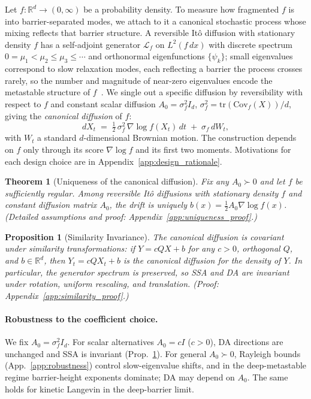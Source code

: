 \documentclass{article}
\newcommand{\R}{\mathbb{R}}
\newcommand{\Cov}{\mathrm{Cov}}
\newcommand{\tr}{\mathrm{tr}}
\newtheorem{theorem}{Theorem}
\newtheorem{proposition}{Proposition}
\begin{document}
Let $f : \R^d \to (0, \infty)$ be a probability density. To measure how fragmented $f$ is into barrier-separated modes, we attach to it a canonical stochastic process whose mixing reflects that barrier structure. A reversible It\^o diffusion with stationary density
$f$ has a self-adjoint generator $\mathcal{L}_f$ on $L^2(f\,dx)$ with
discrete spectrum $0 = \mu_1 < \mu_2 \leq \mu_3 \leq \cdots$ and
orthonormal eigenfunctions $\{\psi_k\}$; small eigenvalues correspond to
slow relaxation modes, each reflecting a barrier the process crosses
rarely, so the number and magnitude of near-zero eigenvalues encode the
metastable structure of $f$~\cite{Pavliotis2014}.
We single out a specific diffusion by reversibility with respect to $f$ and constant scalar diffusion $A_0 = \sigma_f^2 I_d$, $\sigma_f^2 = \tr(\Cov_f(X))/d$, giving the \emph{canonical diffusion} of $f$:
\begin{equation}
dX_t \;=\; \tfrac12\,\sigma_f^2\,\nabla \log f(X_t)\,dt \;+\; \sigma_f\,dW_t,
\label{eq:canonical_sde}
\end{equation}
with $W_t$ a standard $d$-dimensional Brownian motion. The construction
depends on $f$ only through its score $\nabla\log f$ and its first two moments. Motivations for each design choice are in Appendix~\ref{app:design_rationale}.



\begin{theorem}[Uniqueness of the canonical diffusion]
\label{thm:uniqueness}
Fix any $A_0\succ 0$ and let $f$ be sufficiently regular. Among reversible It\^o diffusions with stationary density $f$ and constant diffusion matrix $A_0$, the drift is uniquely $b(x) = \tfrac12 A_0\nabla\log f(x)$. (Detailed assumptions and proof: Appendix~\ref{app:uniqueness_proof}.)
\end{theorem}

\begin{proposition}[Similarity Invariance]
\label{prop:similarity_invariance}
The canonical diffusion is covariant under similarity transformations: if $Y = cQX + b$ for any $c > 0$, orthogonal $Q$, and $b \in \R^d$, then $Y_t = cQX_t + b$ is the canonical diffusion for the density of $Y$. In particular, the generator spectrum is preserved, so SSA and DA are invariant under rotation, uniform rescaling, and translation. (Proof: Appendix~\ref{app:similarity_proof}.)
\end{proposition}

\paragraph{Robustness to the coefficient choice.}
We fix $A_0 = \sigma_f^2 I_d$. For scalar alternatives $A_0 = cI$ ($c>0$), DA directions are unchanged and SSA is invariant (Prop.~\ref{prop:similarity_invariance}). For general $A_0\succ 0$, Rayleigh bounds (App.~\ref{app:robustness}) control slow-eigenvalue shifts, and in the deep-metastable regime barrier-height exponents dominate; DA may depend on $A_0$. The same holds for kinetic Langevin in the deep-barrier limit.
\end{document}
